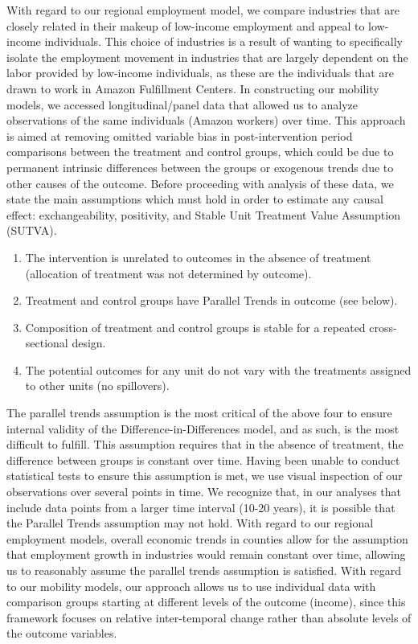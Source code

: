 \documentclass[11pt]{article}
\begin{document}
\-\hspace{0.5cm} With regard to our regional employment model, we compare industries that are closely related in their makeup of low-income employment and appeal to low-income individuals. This choice of industries is a result of wanting to specifically isolate the employment movement in industries that are largely dependent on the labor provided by low-income individuals, as these are the individuals that are drawn to work in Amazon Fulfillment Centers. In constructing our mobility models, we accessed longitudinal/panel data that allowed us to analyze observations of the same individuals (Amazon workers) over time. This approach is aimed at removing omitted variable bias in post-intervention period comparisons between the treatment and control groups, which could be due to permanent intrinsic differences between the groups or exogenous trends due to other causes of the outcome. Before proceeding with analysis of these data, we state the main assumptions which must hold in order to estimate any causal effect: exchangeability, positivity, and Stable Unit Treatment Value Assumption (SUTVA). 
\begin{enumerate}
    \item The intervention is unrelated to outcomes in the absence of treatment (allocation of treatment was not determined by outcome).
    \item Treatment and control groups have Parallel Trends in outcome (see below).
    \item Composition of treatment and control groups is stable for a repeated cross-sectional design.
    \item The potential outcomes for any unit do not vary with the treatments assigned to other units (no spillovers).
\end{enumerate}
\-\hspace{0.5cm} The parallel trends assumption is the most critical of the above four to ensure internal validity of the Difference-in-Differences model, and as such, is the most difficult to fulfill. This assumption requires that in the absence of treatment, the difference between groups is constant over time. Having been unable to conduct statistical tests to ensure this assumption is met, we use visual inspection of our observations over several points in time. We recognize that, in our analyses that include data points from a larger time interval (10-20 years), it is possible that the Parallel Trends assumption may not hold. With regard to our regional employment models, overall economic trends in counties allow for the assumption that employment growth in industries would remain constant over time, allowing us to reasonably assume the parallel trends assumption is satisfied. With regard to our mobility models, our approach allows us to use individual data with comparison groups starting at different levels of the outcome (income), since this framework focuses on relative inter-temporal change rather than absolute levels of the outcome variables. 
\end{document}
